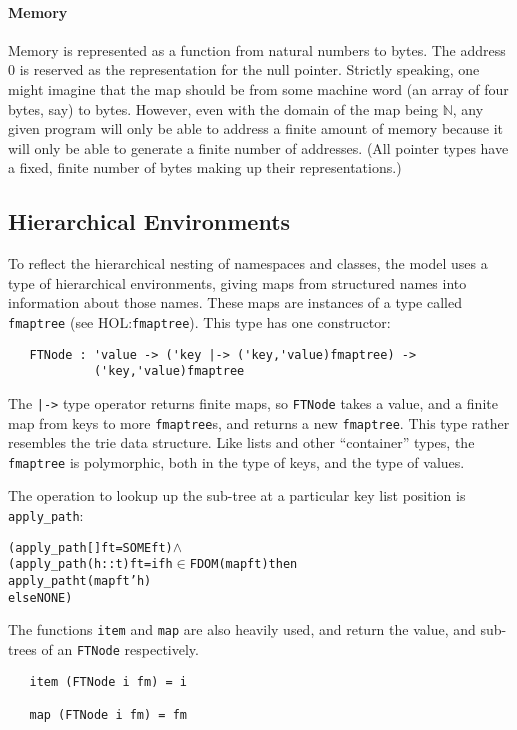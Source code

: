 \documentclass[11pt]{article}
\newcommand{\HOLfile}[1]{HOL:\texttt{#1}}
\begin{document}
\paragraph{Memory}
Memory is represented as a function from natural numbers to bytes.
The address 0 is reserved as the representation for the null pointer.
Strictly speaking, one might imagine that the map should be from some
machine word (an array of four bytes, say) to bytes.  However, even
with the domain of the map being $\mathbb{N}$, any given program will
only be able to address a finite amount of memory because it will only
be able to generate a finite number of addresses.  (All pointer types
have a fixed, finite number of bytes making up their representations.)

\subsection{Hierarchical Environments}
\label{sec:hierarchical-environments}

To reflect the hierarchical nesting of namespaces and classes, the
model uses a type of hierarchical environments, giving maps from
structured names into information about those names.  These maps are
instances of a type called \texttt{fmaptree} (see \HOLfile{fmaptree}).
This type has one constructor:
\begin{verbatim}
   FTNode : 'value -> ('key |-> ('key,'value)fmaptree) ->
            ('key,'value)fmaptree
\end{verbatim}
The \texttt{|->} type operator returns finite maps, so
\texttt{FTNode} takes a value, and a finite map from keys to more
\texttt{fmaptree}s, and returns a new \texttt{fmaptree}.  This type
rather resembles the trie data structure.  Like lists and other
``container'' types, the \texttt{fmaptree} is polymorphic, both in the
type of keys, and the type of values.

The operation to lookup up the sub-tree at a particular key list position
is \texttt{apply_path}:
\begin{alltt}
  (apply_path [] ft = SOME ft) \(\land\)
  (apply_path (h::t) ft = if h \(\in\) FDOM (map ft) then
                             apply_path t (map ft ' h)
                          else NONE)

\end{alltt}

The functions \texttt{item} and \texttt{map} are also heavily used,
and return the value, and sub-trees of an \texttt{FTNode}
respectively.
\begin{verbatim}
   item (FTNode i fm) = i

   map (FTNode i fm) = fm
\end{verbatim}
\end{document}
